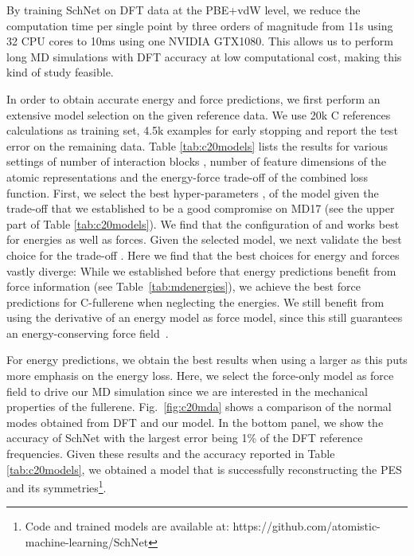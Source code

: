 \documentclass[aip,jcp,reprint,graphicx]{revtex4-1}
\newcommand{\new}[1]{#1}
\begin{document}
By training SchNet on DFT data at the PBE+vdW level, we reduce the computation time per single point by three orders of magnitude from 11s using 32 CPU cores to 10ms using one NVIDIA GTX1080.
This allows us to perform long MD simulations with DFT accuracy at low computational cost, making this kind of study feasible.

In order to obtain accurate energy and force predictions, we first perform an extensive model selection on the given reference data.
We use 20k C references calculations as training set, 4.5k examples for early stopping and report the test error on the remaining data.
Table \ref{tab:c20models} lists the results for various settings of number of interaction blocks , number of feature dimensions  of the atomic representations and the energy-force trade-off  of the combined loss function.
First, we select the best hyper-parameters ,  of the model given the trade-off  that we established to be a good compromise on MD17 (see the upper part of Table \ref{tab:c20models}).
We find that the configuration of  and  works best for energies as well as forces.
Given the selected model, we next validate the best choice for the trade-off .
Here we find that the best choices for energy and forces vastly diverge:
While we established before that energy predictions benefit from force information (see Table~\ref{tab:mdenergies}), we achieve the best force predictions for C-fullerene when neglecting the energies. 
We still benefit from using the derivative of an energy model as force model, since this still guarantees an energy-conserving force field~\citep{chmiela2017machine}.

For energy predictions, we obtain the best results when using a larger  as this puts more emphasis on the energy loss. \new{Here, we select the force-only model as force field to drive our MD simulation since we are interested in the mechanical properties of the  fullerene.}
Fig.~\ref{fig:c20mda} shows a comparison of the normal modes obtained from DFT and our model. 
In the bottom panel, we show the accuracy of SchNet with the largest error being 1\% of the DFT reference frequencies. 
Given these results and the accuracy reported in Table \ref{tab:c20models}, we obtained a model that is successfully reconstructing the PES and its symmetries\footnote{Code and trained models are available at: https://github.com/atomistic-machine-learning/SchNet}.
\end{document}

